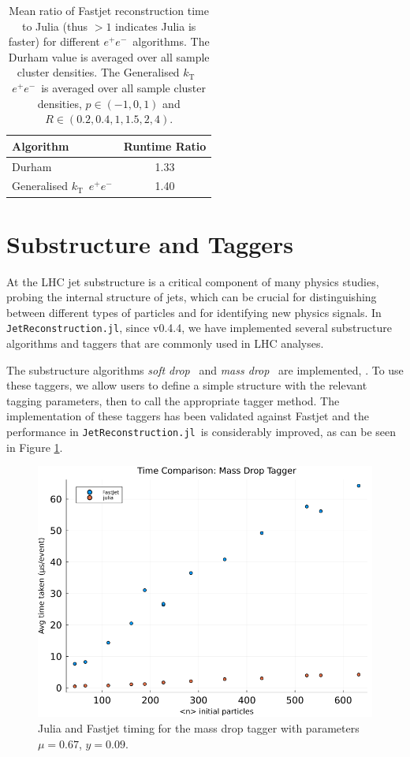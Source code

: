 \documentclass{webofc}
\newcommand{\kt}{${k}_\text{T}$}
\newcommand{\JR}{\texttt{JetReconstruction.jl}}
\newcommand{\ee}{$e^+e^-$}
\begin{document}
\begin{table}[h]
    \begin{center}
        \begin{tabular}{l|c}
            \textbf{Algorithm} & \textbf{Runtime Ratio} \\
            \hline
            Durham & 1.33 \\
            Generalised \kt\ \ee & 1.40 \\
        \end{tabular}
        \caption{Mean ratio of Fastjet reconstruction time to Julia (thus $>1$ indicates Julia is faster) for different \ee\ algorithms. The Durham value is averaged over all sample cluster densities. The Generalised \kt\ \ee\ is averaged over all sample cluster densities, $p \in (-1, 0, 1)$ and $R \in (0.2, 0.4, 1, 1.5, 2, 4)$.}
        \label{tab:eeratios}
    \end{center}
\end{table}

\section{Substructure and Taggers}
\label{sec:sstag}

At the LHC jet substructure is a critical component of many physics studies,
probing the internal structure of jets, which can be crucial for distinguishing
between different types of particles and for identifying new physics signals. In
\JR, since v0.4.4, we have implemented several substructure algorithms and taggers that are
commonly used in LHC analyses.

The substructure algorithms \emph{soft
drop}~\cite{Larkoski_2014} and \emph{mass drop}~\cite{Butterworth_2008} are
implemented, . To use these taggers, we allow users to define a simple structure
with the relevant tagging parameters, then to call the appropriate tagger
method. The implementation of these taggers has been validated against Fastjet
and the performance in \JR\ is considerably improved, as can be seen in Figure
\ref{fig:massdrop}.

\begin{figure}[h]
    \begin{center}
        \includegraphics[width=0.6\linewidth]{time-massdrop.png}
        \caption{Julia and Fastjet timing for the mass drop tagger with parameters $\mu=0.67$, $y=0.09$.}
        \label{fig:massdrop}
    \end{center}
\end{figure}
\end{document}
